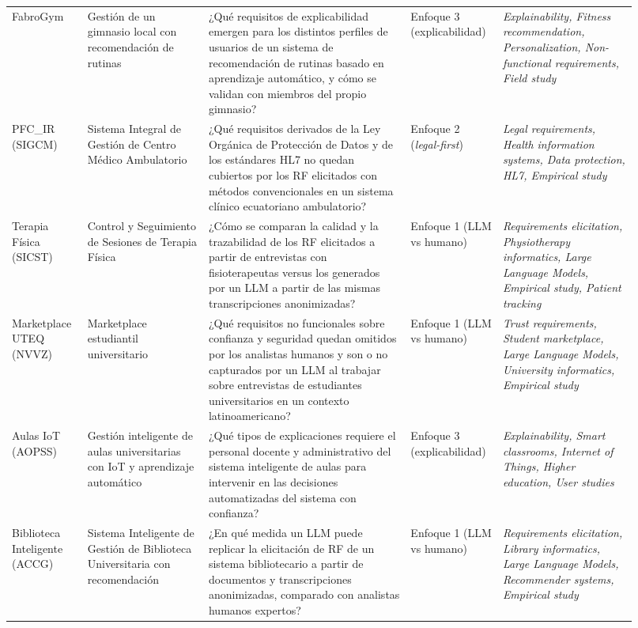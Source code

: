 \documentclass[11pt,a4paper]{article}
\begin{document}
\begin{longtable}{@{}p{0.115\linewidth} p{0.185\linewidth} p{0.30\linewidth} p{0.12\linewidth} p{0.20\linewidth}@{}}
    FabroGym & Gestión de un gimnasio local con recomendación de rutinas & ¿Qué requisitos de explicabilidad emergen para los distintos perfiles de usuarios de un sistema de recomendación de rutinas basado en aprendizaje automático, y cómo se validan con miembros del propio gimnasio? & Enfoque 3 (explicabilidad) & \emph{Explainability, Fitness recommendation, Personalization, Non-functional requirements, Field study}\\
    PFC\_IR (SIGCM) & Sistema Integral de Gestión de Centro Médico Ambulatorio & ¿Qué requisitos derivados de la Ley Orgánica de Protección de Datos y de los estándares HL7 no quedan cubiertos por los RF elicitados con métodos convencionales en un sistema clínico ecuatoriano ambulatorio? & Enfoque 2 (\emph{legal-first}) & \emph{Legal requirements, Health information systems, Data protection, HL7, Empirical study}\\
    Terapia Física (SICST) & Control y Seguimiento de Sesiones de Terapia Física & ¿Cómo se comparan la calidad y la trazabilidad de los RF elicitados a partir de entrevistas con fisioterapeutas versus los generados por un LLM a partir de las mismas transcripciones anonimizadas? & Enfoque 1 (LLM vs humano) & \emph{Requirements elicitation, Physiotherapy informatics, Large Language Models, Empirical study, Patient tracking}\\
    Marketplace UTEQ (NVVZ) & Marketplace estudiantil universitario & ¿Qué requisitos no funcionales sobre confianza y seguridad quedan omitidos por los analistas humanos y son o no capturados por un LLM al trabajar sobre entrevistas de estudiantes universitarios en un contexto latinoamericano? & Enfoque 1 (LLM vs humano) & \emph{Trust requirements, Student marketplace, Large Language Models, University informatics, Empirical study}\\
    Aulas IoT (AOPSS) & Gestión inteligente de aulas universitarias con IoT y aprendizaje automático & ¿Qué tipos de explicaciones requiere el personal docente y administrativo del sistema inteligente de aulas para intervenir en las decisiones automatizadas del sistema con confianza? & Enfoque 3 (explicabilidad) & \emph{Explainability, Smart classrooms, Internet of Things, Higher education, User studies}\\
    Biblioteca Inteligente (ACCG) & Sistema Inteligente de Gestión de Biblioteca Universitaria con recomendación & ¿En qué medida un LLM puede replicar la elicitación de RF de un sistema bibliotecario a partir de documentos y transcripciones anonimizadas, comparado con analistas humanos expertos? & Enfoque 1 (LLM vs humano) & \emph{Requirements elicitation, Library informatics, Large Language Models, Recommender systems, Empirical study}\\

\end{longtable}
\end{document}
